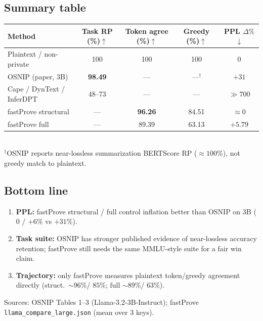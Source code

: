 \documentclass[11pt,a4paper]{article}
\begin{document}
\subsection*{Summary table}
\begin{center}
\small
\begin{tabular}{@{}lcccc@{}}
\toprule
\textbf{Method} &
\textbf{Task RP (\%)$\uparrow$} &
\textbf{Token agree (\%)$\uparrow$} &
\textbf{Greedy (\%)$\uparrow$} &
\textbf{PPL $\Delta\%$ $\downarrow$} \\
\midrule
Plaintext / non-private & 100 & 100 & 100 & 0 \\
OSNIP (paper, 3B) & \textbf{98.49} & --- & ---$^{\dagger}$ & $+31$ \\
Cape / DynText / InferDPT & 48--73 & --- & --- & $\gg 700$ \\
\addlinespace
fastProve structural & --- & \textbf{96.26} & 84.51 & \textbf{$\approx 0$} \\
fastProve full & --- & 89.39 & 63.13 & $+5.79$ \\
\bottomrule
\end{tabular}\\[0.3em]
{\footnotesize $^{\dagger}$OSNIP reports near-lossless summarization BERTScore RP ($\approx 100\%$), not greedy match to plaintext.}
\end{center}

\vspace{0.5em}
\subsection*{Bottom line}
\begin{enumerate}
  \item \textbf{PPL:} fastProve structural / full control inflation better than OSNIP on 3B
  ($0$ / $+6\%$ vs $+31\%$).
  \item \textbf{Task suite:} OSNIP has stronger published evidence of near-lossless accuracy
  retention; fastProve still needs the same MMLU-style suite for a fair win claim.
  \item \textbf{Trajectory:} only fastProve measures plaintext token/greedy agreement directly
  (struct.\ $\sim 96\%$/ $85\%$; full $\sim 89\%$/ $63\%$).
\end{enumerate}

\vspace{0.3em}
{\scriptsize\color{Cnote}
Sources: OSNIP Tables 1--3 (Llama-3.2-3B-Instruct);
fastProve \texttt{llama\_compare\_large.json} (mean over 3 keys).
}
\end{document}
